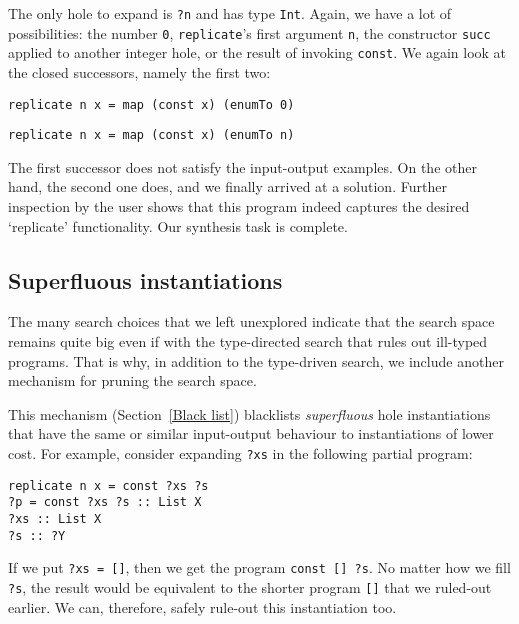 The only hole to expand is \lstinline|?n| and has type \lstinline|Int|.  Again, we have a lot of possibilities: the number \lstinline|0|, \lstinline|replicate|'s first argument \lstinline|n|, the constructor \lstinline|succ| applied to another integer hole, or the result of invoking \lstinline|const|.  We again look at the closed successors, namely the first two:
\begin{lstlisting}
replicate n x = map (const x) (enumTo 0)
\end{lstlisting}
\begin{lstlisting}
replicate n x = map (const x) (enumTo n)
\end{lstlisting}
The first successor does not satisfy the input-output examples.  On the other hand, the second one does, and we finally arrived at a solution.  Further inspection by the user shows that this program indeed captures the desired `replicate' functionality.  Our synthesis task is complete.

\subsection{Superfluous instantiations}
The many search choices that we left unexplored indicate that the search space remains quite big even if with the type-directed search that rules out ill-typed programs.  That is why, in addition to the type-driven search, we include another mechanism for pruning the search space.

This mechanism (Section~\ref{Black list}) blacklists \emph{superfluous} hole instantiations that have the same or similar input-output behaviour to instantiations of lower cost.  For example, consider expanding \lstinline|?xs| in the following partial program:
\begin{lstlisting}[style=plain]
replicate n x = const ?xs ?s
?p = const ?xs ?s :: List X
?xs :: List X
?s :: ?Y
\end{lstlisting}
If we put \lstinline|?xs = []|, then we get the program \lstinline|const [] ?s|.  No matter how we fill \lstinline|?s|, the result would be equivalent to the shorter program \lstinline|[]| that we ruled-out earlier.  We can, therefore, safely rule-out this instantiation too.


